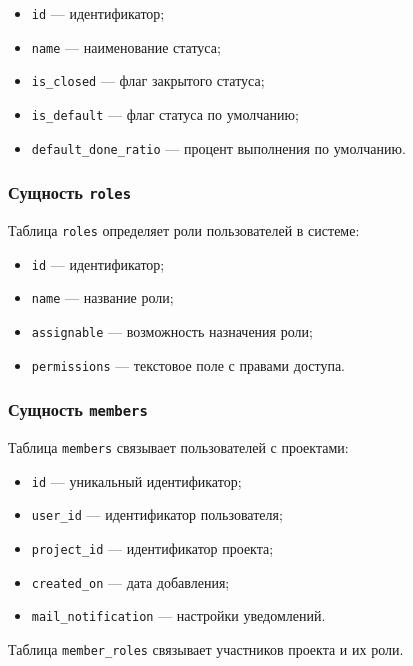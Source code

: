 \begin{itemize}
    \item \texttt{id} --- идентификатор;
    \item \texttt{name} --- наименование статуса;
    \item \texttt{is\_closed} --- флаг закрытого статуса;
    \item \texttt{is\_default} --- флаг статуса по умолчанию;
    \item \texttt{default\_done\_ratio} --- процент выполнения по умолчанию.
\end{itemize}

\subsubsection{Сущность \texttt{roles}}

Таблица \texttt{roles} определяет роли пользователей в системе:

\begin{itemize}
    \item \texttt{id} --- идентификатор;
    \item \texttt{name} --- название роли;
    \item \texttt{assignable} --- возможность назначения роли;
    \item \texttt{permissions} --- текстовое поле с правами доступа.
\end{itemize}

\subsubsection{Сущность \texttt{members}}

Таблица \texttt{members} связывает пользователей с проектами:

\begin{itemize}
    \item \texttt{id} --- уникальный идентификатор;
    \item \texttt{user\_id} --- идентификатор пользователя;
    \item \texttt{project\_id} --- идентификатор проекта;
    \item \texttt{created\_on} --- дата добавления;
    \item \texttt{mail\_notification} --- настройки уведомлений.
\end{itemize}

Таблица \texttt{member\_roles} связывает участников проекта и их роли.

